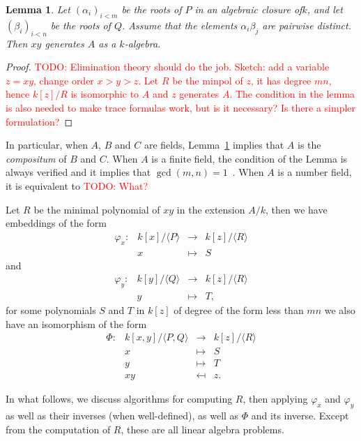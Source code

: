 \documentclass[12pt]{article}
\newcommand{\todo}[1]{\textcolor{red}{TODO: #1}}
\newtheorem{Lemma}{Lemma}
\begin{document}
\begin{Lemma}
  \label{lemma:compositum}
  Let $(\alpha_i)_{i<m}$ be the roots of $P$ in an algebraic closure
  of$k$, and let $(\beta_i)_{i<n}$ be the roots of $Q$. Assume that
  the elements $\alpha_i\beta_j$ are pairwise distinct. Then $xy$
  generates $A$ as a $k$-algebra.
\end{Lemma}
\begin{proof}
  \todo{Elimination theory should do the job. Sketch: add a variable
    $z=xy$, change order $x>y>z$. Let $R$ be the minpol of $z$, it has
    degree $mn$, hence $k[z]/R$ is isomorphic to $A$ and $z$ generates
    $A$.  The condition in the lemma is also needed to make trace
    formulas work, but is it necessary? Is there a simpler
    formulation?}
\end{proof}

In particular, when $A$, $B$ and $C$ are fields,
Lemma~\ref{lemma:compositum} implies that $A$ is the \emph{compositum} of
$B$ and $C$. When $A$ is a finite field, the condition of the Lemma is
always verified and it implies that $\gcd(m,n)=1$~\cite{todo}. When
$A$ is a number field, it is equivalent to \todo{What?}

Let $R$ be the minimal polynomial of $xy$ in the extension $A/k$, then
we have embeddings of the form
$$\begin{array}{cccc}
\varphi_x: & k[x]/\langle P \rangle & \to & k[z]/\langle R \rangle\\
& x & \mapsto & S
\end{array}$$
and
$$\begin{array}{cccc}
\varphi_y: & k[y]/\langle Q \rangle & \to & k[z]/\langle R \rangle\\
& y & \mapsto & T,
\end{array}$$
for some polynomials $S$ and $T$ in $k[z]$ of degree of the form less
than $mn$ we also have an isomorphism of the form
$$\begin{array}{cccc} 
\Phi:&  k[x,y]/\langle P,Q\rangle & \to & k[z]/\langle R \rangle \\
&  x & \mapsto & S \\
&  y & \mapsto & T \\
&  xy & \mapsfrom & z.
\end{array}$$

In what follows, we discuss algorithms for computing $R$, then
applying $\varphi_x$ and $\varphi_y$ as well as their inverses (when
well-defined), as well as $\Phi$ and its inverse. Except from the
computation of $R$, these are all linear algebra problems. 
\end{document}
